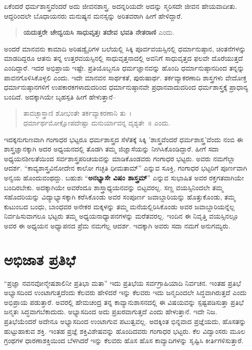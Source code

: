 {ಏಕೆಂದರೆ ಧರ್ಮಶಾಸ್ತ್ರವೆಂದರೆ ಅದು ಜೀವನಶಾಸ್ತ್ರ. ಅದನ್ನರಿಯದೇ ಅದನ್ನು ಸ್ಮರಿಸದೇ ಜೀವನ ಹೇಯವಾದೀತು. ಆದ್ದರಿಂದಲೇ ಬೊಧಾಯನರು ಮನುಷ್ಯನ ಮನಸ್ಸನ್ನು ಅರಿತವರಾಗಿ ಹೀಗೆ ಹೇಳಿದ್ದಾರೆ.
\begin{verse}
\textbf{ಯದುತ್ತರೇ ಚೇದ್ವಯಸಿ ಸಾಧುವೃತ್ತಃ ತದೇವ ಭವತಿ ನೇತರಾಣಿ} ಎಂದು.
\end{verse}
ಅಂದರೆ ಮಾನವನು ಕಾಮಾದಿ ಅರಿಷಡ್ವೈರಿಗಳ ಬಲೆಯಲ್ಲಿ ಸಿಕ್ಕಿ ಪೂರ್ವವಯಸ್ಸಿನಲ್ಲಿ ಧರ್ಮಾನುಷ್ಠಾನ, ಚಿಂತನೆಗಳನ್ನು ಮಾಡದಿದ್ದರೂ ಆತನು ತನ್ನ ಉತ್ತರವಯಸ್ಸಿನಲ್ಲಿ ಸಾಧುವೃತ್ತನಾದಲ್ಲಿ ಅವನಿಗೆ ಸಾಧುವೃತ್ತದ ಫಲವೇ ದೊರೆಯುತ್ತದೆ ಎಂದಿದ್ದಾರೆ. ಇದರ ಅಭಿಪ್ರಾಯ ಇಷ್ಟೇ. ಪ್ರತಿಯೊಬ್ಬನೂ ಧರ್ಮಜ್ಞಾನವನ್ನು ಹೊಂದಿ ಧರ್ಮಾನುಷ್ಠಾನದಿಂದ ತನ್ನನ್ನು ಪಾವನಗೊಳಿಸಿಕೊಳ್ಳಲಿ ಎಂದು. ಇದೇ ಮಾನವನ ಸಾರ್ಥಕತೆ, ಪುರುಷಾರ್ಥ. ತರ್ಕವ್ಯಾಕರಣಾದಿ ಶಾಸ್ತ್ರಗಳು ವೇದೋಕ್ತ ಧರ್ಮಾನುಷ್ಠಾನಗಳಿಗೆ ಉಪಕಾರಕಗಳಾದುದರಿಂದ ಧರ್ಮಾನುಷ್ಠಾನವೇ ಪ್ರಧಾನವಾದುದರಿಂದ ಧರ್ಮಶಾಸ್ತ್ರಕ್ಕೆ ಪ್ರಾಧಾನ್ಯ ಬಂದಿದೆ. ಅದಕ್ಕಾಗಿಯೇ ಬೃಹಸ್ಪತಿ ಹೀಗೆ ಹೇಳುತ್ತಾನೆ–
\begin{verse}
ತಾವಚ್ಛಾಸ್ತ್ರಾಣಿ ಶೋಭಂತೇ ತರ್ಕವ್ಯಾಕರಣಾನಿ ತು~।\\
ಧರ್ಮಾರ್ಥಮೋಕ್ಷೋಪದೇಷ್ಟಾ ಮನುರ್ಯಾವನ್ನ ದೃಶ್ಯತೇ~॥ ಎಂದು.
\end{verse}
ಇದಕ್ಕನುಗುಣವಾಗಿ ಗಂಗಾಧರ ಭಟ್ಟರೂ ಧರ್ಮಶಾಸ್ತ್ರದ ಸೆಳೆತಕ್ಕೆ ಸಿಕ್ಕಿ ’ಶಾಸ್ತ್ರವೆಂದರೆ ಧರ್ಮಶಾಸ್ತ್ರ’ವೆಂದು ನಂಬಿ ಈ ಶಾಸ್ತ್ರಜ್ಞಾನಕ್ಕಾಗಿ ಅದರ ಅಧ್ಯಯನದಲ್ಲಿ ತೊಡಗಿ ತಮ್ಮ ಜಿಜ್ಞಾಸೆಯನ್ನು ನೀಗಿಸಿಕೊಂಡಿದ್ದಾರೆ. ಹೀಗೆ ಸದಾ ಅಧ್ಯಯನಶೀಲತೆಯಿಂದ ಸರ್ವಶಾಸ್ತ್ರಪರಿಚಯವನ್ನು ಮಾಡಿಕೊಂಡವರು ಗಂಗಾಧರ ಭಟ್ಟರು. ಅವರು ನಮಗೆಲ್ಲಾ ಆದರ್ಶ. “ಕಾವ್ಯಶಾಸ್ತ್ರವಿನೋದೇನ ಕಾಲೋ ಗಚ್ಛತಿ ಧೀಮತಾಮ್” ಎನ್ನುವ ಸೂಕ್ತಿ, ಗಂಗಾಧರ ಭಟ್ಟರಿಗೆ ಪೂರ್ಣವಾಗಿ ಅನ್ವಯ ಹೊಂದುವಂಥದ್ದು. ಬಹುಶಃ “\textbf{ಅನಭ್ಯಾಸೇ ವಿಷಂ ಶಾಸ್ತ್ರಮ್}” ಎನ್ನುವ ಸುಭಾಷಿತ ಅವರ ರಕ್ತಗತವಾಗಿಯೇ ಬಂದಿರಬೇಕು. ಅದಕ್ಕಾಗಿಯೇ ಅವರೆಂದೂ ಶಾಸ್ತ್ರಾಧ್ಯಯನವನ್ನು ಬಿಟ್ಟವರಲ್ಲ. ಸಣ್ಣ ವಯಸ್ಸಿನಿಂದಲೇ ತಮ್ಮ ಸಹೊದರಿಯನ್ನು ವಿದ್ಯಾಭ್ಯಾಸಕ್ಕಾಗಿ ಕರೆಸಿಕೊಂಡು ಅವರ ಸಂಪೂರ್ಣ ಜವಾಬ್ದಾರಿಯನ್ನು ಹೊತ್ತುಕೊಂಡು, ತಮ್ಮ ಕುಟುಂಬದ ಬಂಧು, ಬಾಂಧವರ ಅನೇಕರ ಮಕ್ಕಳನ್ನು ತಮ್ಮ ಮನೆಯಲ್ಲಿರಿಸಿಕೊಂಡು ಅವರ ಜವಾಬ್ದಾರಿಯನ್ನೆಲ್ಲ ನಿರ್ವಹಿಸುವಾಗಲೂ ಭಟ್ಟರು ತಮ್ಮ ಅಧ್ಯಯನಾಧ್ಯಾಪನಗಳನ್ನು ಮರೆತವರಲ್ಲ. ಇಂದಿನ ಈ ನಿವೃತ್ತಿ ವಯಸ್ಸಿನಲ್ಲೂ ಅವರ ಈ ಅಧ್ಯಯನ ಅಧ್ಯಾಪನದ ಪ್ರೆಮ ನಮಗೆಲ್ಲ ಆದರ್ಶ. ಇದಕ್ಕಾಗಿ ಅವರು ಸದಾ ನಮಗೆ ಅನುಗಮ್ಯರು.

\section*{ಅಭಿಜಾತ ಪ್ರತಿಭೆ}  

“ಪ್ರಜ್ಞಾ ನವನವೋನ್ಮೇಷಶಾಲಿನೀ ಪ್ರತಿಭಾ ಮತಾ” ಇದು ಪ್ರತಿಭೆಯ ಸರ್ವಗ್ರಾಹಿಯಾದಿ ನಿರ್ವಚನ. ಇಂತಹ ಪ್ರತಿಭೆ ಅಭ್ಯಾಸದಿಂದ ಉಂಟಾಗುತ್ತದೆಂದು ಕೆಲವರು ಹೇಳಿದರೆ ಇನ್ನು ಕೆಲವರು ಇದು ಜನ್ಮದಿಂದಲೇ ಸಿದ್ಧವಾಗಿರುತ್ತದೆ ಎಂದು ಅಭಿಪ್ರಾಯ ಪಡುತ್ತಾರೆ. ಅವರಲ್ಲಿ ಹೇಮಚಂದ್ರ ತನ್ನ ಕಾವ್ಯಾನುಶಾಸನದಲ್ಲಿ ಈ ವಿಷಯವನ್ನು ಸ್ಪಷ್ಟಪಡಿಸುತ್ತಾ ಪ್ರತಿಭೆ ಜನ್ಮತಃ ಸಿದ್ಧವಾಗಬೆಕಾದುದು. ಅಭ್ಯಾಸದಿಂದ ಅದು ಪ್ರಖರವಾಗುತ್ತದೆ ಎಂದು ಹೇಳುತ್ತಾನೆ. ಇದೇ ನಿಜ. ಪ್ರತಿಭೆಯೆಂದರೆ ಅದೇನೂ ಅಭ್ಯಾಸದಿಂದ ಉಂಟಾಗುವ ಪಟುತ್ವವಲ್ಲ. ಅದಕ್ಕಿಂತ ಭಿನ್ನವಾದ ಪ್ರಜ್ಞೆಯದು, ಹೊಸತನ್ನು ಹುಟ್ಟುಹಾಕುವ ಶಕ್ತಿ. ಇಂತಹ ಪ್ರಜ್ಞೆ ಶಕ್ತಿವಿಶೇಷವನ್ನು ಹೊಂದಿದವರು ಗಂಗಾಧರ ಭಟ್ಟರು. ಕೆಲ ವಿದ್ವಾಂಸರು ಮೂಲ ಗ್ರಂಥಗಳ ಧಾರಣಾಶಕ್ತಿಯಿಂದ ಬೆಳಗಿದರೆ ಇನ್ನು ಕೆಲವರು ಹೊಸ ಹೊಸ ಕಾವ್ಯಾದಿಗಳನ್ನು ಸೃಷ್ಟಿಸಿ ಕೀರ್ತಿಗಳಿಸುತ್ತಾರೆ. 

}
